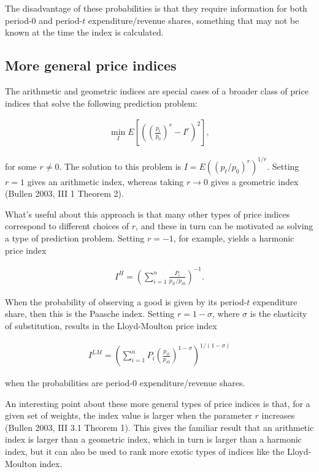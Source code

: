 \documentclass[]{article}
\begin{document}
The disadvantage of these probabilities is that they require information for both period-0 and period-\(t\) expenditure/revenue shares, something that may not be known at the time the index is calculated.

\hypertarget{more-general-price-indices}{%
\subsection{More general price indices}\label{more-general-price-indices}}

The arithmetic and geometric indices are special cases of a broader class of price indices that solve the following prediction problem:

\begin{align*}
\min_{I} E\left[\left(\left(\frac{p_{t}}{p_{0}}\right)^{r} - I^{r} \right)^{2}\right],
\end{align*}

for some \(r \neq 0\). The solution to this problem is \(I = E((p_{t} / p_{0})^{r})^{1 / r}\). Setting \(r = 1\) gives an arithmetic index, whereas taking \(r \rightarrow 0\) gives a geometric index (Bullen 2003, III 1 Theorem 2).

What's useful about this approach is that many other types of price indices correspond to different choices of \(r\), and these in turn can be motivated as solving a type of prediction problem. Setting \(r = -1\), for example, yields a harmonic price index

\begin{align*}
I^{H} = \left(\sum_{i = 1}^{n} \frac{P_{i}}{p_{it} / p_{i0}} \right)^{-1}.
\end{align*}

When the probability of observing a good is given by its period-\(t\) expenditure share, then this is the Paasche index. Setting \(r = 1 - \sigma\), where \(\sigma\) is the elasticity of substitution, results in the Lloyd-Moulton price index

\begin{align*}
I^{LM} = \left(\sum_{i = 1}^{n} P_{i} \left(\frac{p_{it}}{p_{i0}}\right)^{1 - \sigma}\right)^{1 / (1 - \sigma)}
\end{align*}

when the probabilities are period-0 expenditure/revenue shares.

An interesting point about these more general types of price indices is that, for a given set of weights, the index value is larger when the parameter \(r\) increases (Bullen 2003, III 3.1 Theorem 1). This gives the familiar result that an arithmetic index is larger than a geometric index, which in turn is larger than a harmonic index, but it can also be used to rank more exotic types of indices like the Lloyd-Moulton index.
\end{document}
